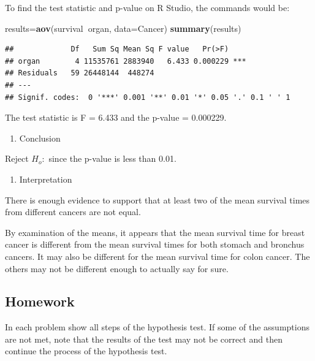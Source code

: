 \documentclass[]{book}
\newenvironment{Shaded}{\begin{snugshade}}{\end{snugshade}}
\newcommand{\DataTypeTok}[1]{\textcolor[rgb]{0.13,0.29,0.53}{#1}}
\newcommand{\KeywordTok}[1]{\textcolor[rgb]{0.13,0.29,0.53}{\textbf{#1}}}
\newcommand{\NormalTok}[1]{#1}
\newcommand{\OperatorTok}[1]{\textcolor[rgb]{0.81,0.36,0.00}{\textbf{#1}}}
\providecommand{\tightlist}{%
  \setlength{\itemsep}{0pt}\setlength{\parskip}{0pt}}
\begin{document}
To find the test statistic and p-value on R Studio, the commands would be:

\begin{Shaded}
\begin{Highlighting}[]
\NormalTok{results=}\KeywordTok{aov}\NormalTok{(survival}\OperatorTok{~}\NormalTok{organ, }\DataTypeTok{data=}\NormalTok{Cancer)}
\KeywordTok{summary}\NormalTok{(results)}
\end{Highlighting}
\end{Shaded}

\begin{verbatim}
##             Df   Sum Sq Mean Sq F value   Pr(>F)    
## organ        4 11535761 2883940   6.433 0.000229 ***
## Residuals   59 26448144  448274                     
## ---
## Signif. codes:  0 '***' 0.001 '**' 0.01 '*' 0.05 '.' 0.1 ' ' 1
\end{verbatim}

The test statistic is F = 6.433 and the p-value = 0.000229.

\begin{enumerate}
\def\labelenumi{\arabic{enumi}.}
\setcounter{enumi}{4}
\tightlist
\item
  Conclusion
\end{enumerate}

Reject \(H_o:\) since the p-value is less than 0.01.

\begin{enumerate}
\def\labelenumi{\arabic{enumi}.}
\setcounter{enumi}{5}
\tightlist
\item
  Interpretation
\end{enumerate}

There is enough evidence to support that at least two of the mean survival times from different cancers are not equal.

By examination of the means, it appears that the mean survival time for breast cancer is different from the mean survival times for both stomach and bronchus cancers. It may also be different for the mean survival time for colon cancer. The others may not be different enough to actually say for sure.

\hypertarget{homework-34}{%
\subsection{Homework}\label{homework-34}}

In each problem show all steps of the hypothesis test. If some of the assumptions are not met, note that the results of the test may not be correct and then continue the process of the hypothesis test.
\end{document}
